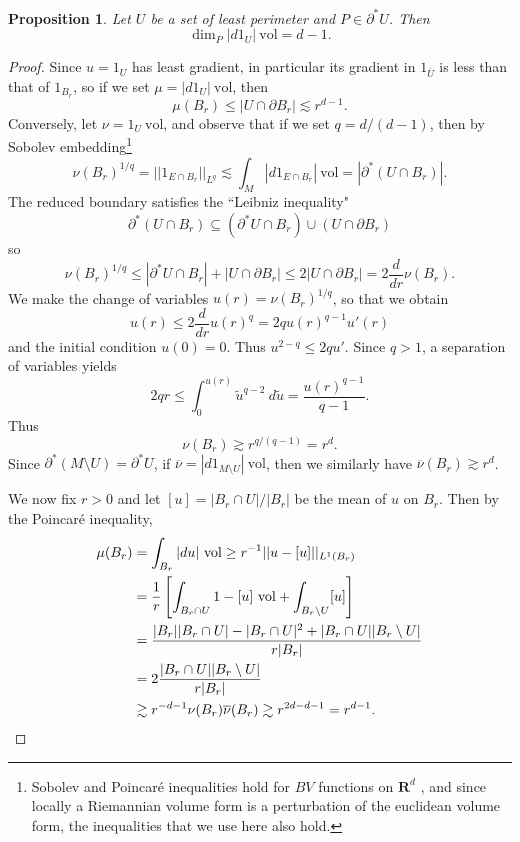 \documentclass[reqno,12pt,letterpaper]{amsart}
\newcommand{\RR}{\mathbf{R}}
\newcommand{\vol}{\mathrm{vol}}
\newtheorem{proposition}[theorem]{Proposition}
\theoremstyle{definition}
\numberwithin{equation}{section}
\begin{document}
\begin{proposition}\label{doubling dimension}
Let $U$ be a set of least perimeter and $P \in \partial^* U$. Then
$$\dim_P |d1_U|~\vol = d - 1.$$
\end{proposition}
\begin{proof}
Since $u = 1_U$ has least gradient, in particular its gradient in $1_{\overline U}$ is less than that of $1_{B_r}$, so if we set $\mu =|d1_U| ~\vol$, then
$$\mu(B_r) \leq |U \cap \partial B_r| \lesssim r^{d - 1}.$$
Conversely, let $\nu = 1_U ~\vol$, and observe that if we set $q = d/(d - 1)$, then by Sobolev embedding\footnote{Sobolev and Poincar\'e inequalities hold for $BV$ functions on $\RR^d$ \cite[\S5.6.1]{evans1991measure},
and since locally a Riemannian volume form is a perturbation of the euclidean volume form, the inequalities that we use here also hold.}
$$\nu(B_r)^{1/q} = ||1_{E \cap B_r}||_{L^q} \lesssim \int_M |d1_{E \cap B_r}| ~\vol = |\partial^*(U \cap B_r)|.$$
The reduced boundary satisfies the ``Leibniz inequality"
$$\partial^*(U \cap B_r) \subseteq (\partial^* U \cap B_r) \cup (U \cap \partial B_r)$$
so
$$\nu(B_r)^{1/q} \leq |\partial^* U \cap B_r| + |U \cap \partial B_r| \leq 2|U \cap \partial B_r| = 2\frac{d}{dr} \nu(B_r).$$
We make the change of variables $u(r) = \nu(B_r)^{1/q}$, so that we obtain
$$u(r) \leq 2 \frac{d}{dr} u(r)^q = 2qu(r)^{q - 1}u'(r)$$
and the initial condition $u(0) = 0$. Thus $u^{2 - q} \leq 2qu'$.
Since $q > 1$, a separation of variables yields
$$2qr \leq \int_0^{u(r)} \tilde u^{q - 2}~d\tilde u = \frac{u(r)^{q - 1}}{q - 1}.$$
Thus
$$\nu(B_r) \gtrsim r^{q/(q - 1)} = r^d.$$
Since $\partial^* (M \setminus U) = \partial^* U$, if $\overline{\nu} = |d1_{M \setminus U}| ~\vol$, then we similarly have $\overline{\nu}(B_r) \gtrsim r^d$.

We now fix $r > 0$ and let $[u] = |B_r \cap U|/|B_r|$ be the mean of $u$ on $B_r$. Then by the Poincar\'e inequality,
\begin{align*}
\mu(B_r) &= \int_{B_r} |du|~\vol \geq r^{-1} ||u - [u]||_{L^1(B_r)} \\
&= \frac{1}{r} \left[\int_{B_r \cap U} 1 -[u] ~\vol + \int_{B_r \setminus U} [u] \right] \\
&= \frac{|B_r||B_r \cap U| - |B_r \cap U|^2 + |B_r \cap U||B_r \setminus U|}{r|B_r|} \\
&= 2\frac{|B_r \cap U||B_r \setminus U|}{r|B_r|}\\
&\gtrsim r^{-d-1} \nu(B_r) \overline{\nu}(B_r) \gtrsim r^{2d-d-1} = r^{d - 1}. \qedhere
\end{align*}
\end{proof}
\end{document}
